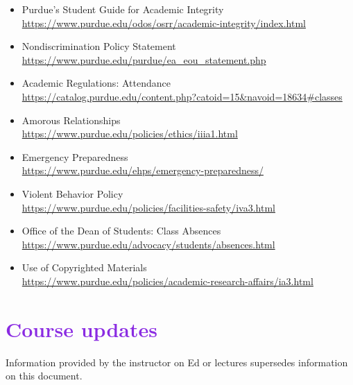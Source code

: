 \documentclass[letterpaper,11pt]{article}
\begin{document}
\begin{itemize}

\item
Purdue's Student Guide for Academic Integrity\\
\url{https://www.purdue.edu/odos/osrr/academic-integrity/index.html}

\item
Nondiscrimination Policy Statement\\
\url{https://www.purdue.edu/purdue/ea_eou_statement.php}

\item
Academic Regulations: Attendance\\
\url{https://catalog.purdue.edu/content.php?catoid=15\&navoid=18634\#classes}


\item
Amorous Relationships\\
\url{https://www.purdue.edu/policies/ethics/iiia1.html}

\item
Emergency Preparedness\\
\url{https://www.purdue.edu/ehps/emergency-preparedness/}

\item
Violent Behavior Policy\\
\url{https://www.purdue.edu/policies/facilities-safety/iva3.html}

\item
Office of the Dean of Students: Class Absences\\
\url{https://www.purdue.edu/advocacy/students/absences.html}

\item
Use of Copyrighted Materials\\
\url{https://www.purdue.edu/policies/academic-research-affairs/ia3.html}

\end{itemize}

\section*{\textcolor{BlueViolet}{Course updates}}

Information provided by the instructor on Ed or lectures supersedes information on this document.

%
%
\end{document}
